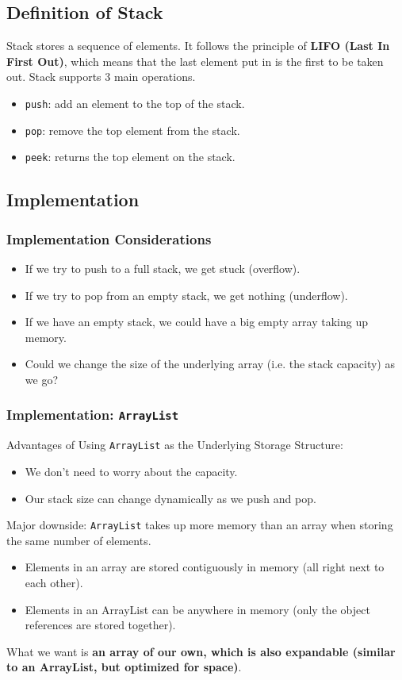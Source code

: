 \documentclass[letterpaper,12pt]{article}
\begin{document}
\subsection{Definition of Stack}
Stack stores a sequence of elements. It follows the principle of \textbf{LIFO (Last In First Out)}, which means that the last element put in is the first to be taken out. Stack supports 3 main operations.
\begin{itemize}
    \item \texttt{push}: add an element to the top of the stack.
    \item \texttt{pop}: remove the top element from the stack.
    \item \texttt{peek}: returns the top element on the stack.
\end{itemize}

\subsection{Implementation}
\subsubsection{Implementation Considerations}
\begin{itemize}
    \item If we try to push to a full stack, we get stuck (overflow).
    \item If we try to pop from an empty stack, we get nothing (underflow).
    \item If we have an empty stack, we could have a big empty array taking up memory.
    \item Could we change the size of the underlying array (i.e. the stack capacity) as we go?
\end{itemize}

\subsubsection{Implementation: \texttt{ArrayList}}
Advantages of Using \texttt{ArrayList} as the Underlying Storage Structure:
\begin{itemize}
    \item We don’t need to worry about the capacity.
    \item Our stack size can change dynamically as we push and pop.
\end{itemize}
Major downside: \texttt{ArrayList} takes up more memory than an array when storing the same number of elements.
\begin{itemize}
    \item Elements in an array are stored contiguously in memory (all right next to each other).
    \item Elements in an ArrayList can be anywhere in memory (only the object references are stored together).
\end{itemize}
What we want is \textbf{an array of our own, which is also expandable (similar to an ArrayList, but optimized for space)}.
\end{document}
